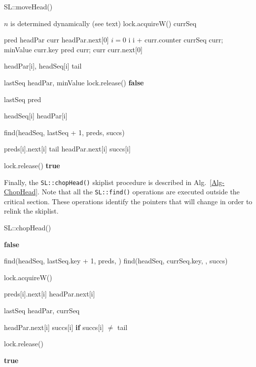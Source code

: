 \begin{algorithm}[!htb]
\caption{SL::moveHead()}
\label{Alg-MoveHead}
\begin{algorithmic}[1]
\State $n$ is determined dynamically (see text)
\State lock.acquireW()
\State currSeq \attr \nullvalue

\State pred \attr headPar
\State curr \attr headPar.next[0]
\State $i = 0$
 \label{algMH:consume}
	\State i \attr i + curr.counter
		\State currSeq \attr curr; minValue \attr curr.key
	\EndIf
	\State pred \attr curr; curr \attr curr.next[0]
\EndWhile

		\State headPar[i], headSeq[i] \attr tail
	\EndFor

	\State lastSeq \attr headPar, minValue \attr \maxLvl
	\State lock.release()
	\State \Return \textbf{false}
\EndIf

\State lastSeq \attr pred

 \label{algMH:copyHead}
	\State headSeq[i] \attr headPar[i]
\EndFor

\State find(headSeq, lastSeq + 1, preds, succs) \label{algMH:unlink}

	\State preds[i].next[i] \attr tail
	\State headPar.next[i] \attr succs[i]
\EndFor

\State lock.release()
\State \Return \textbf{true}
\end{algorithmic}
\end{algorithm}

Finally, the \texttt{SL::chopHead()} skiplist procedure is described in Alg.~\ref{Alg-ChopHead}. Note that all the \texttt{SL::find()} operations are executed outside the critical section. These operations identify the pointers that will change in order to relink the skiplist.

\begin{algorithm}[!htb]
\caption{SL::chopHead()}
\label{Alg-ChopHead}
\begin{algorithmic}[1]
	\State \Return \textbf{false}
\EndIf

\State find(headSeq, lastSeq.key + 1, preds, \nullvalue)
\State find(headSeq, currSeq.key, \nullvalue, succs)

\State lock.acquireW()

	preds[i].next[i] \attr headPar.next[i]
\EndFor

\State lastSeq \attr headPar, currSeq \attr \nullvalue

	\State headPar.next[i] \attr succs[i] \textbf{if} succs[i] $\ne$ tail
\EndFor

\State lock.release()

\State \Return \textbf{true}
\end{algorithmic}
\end{algorithm}

